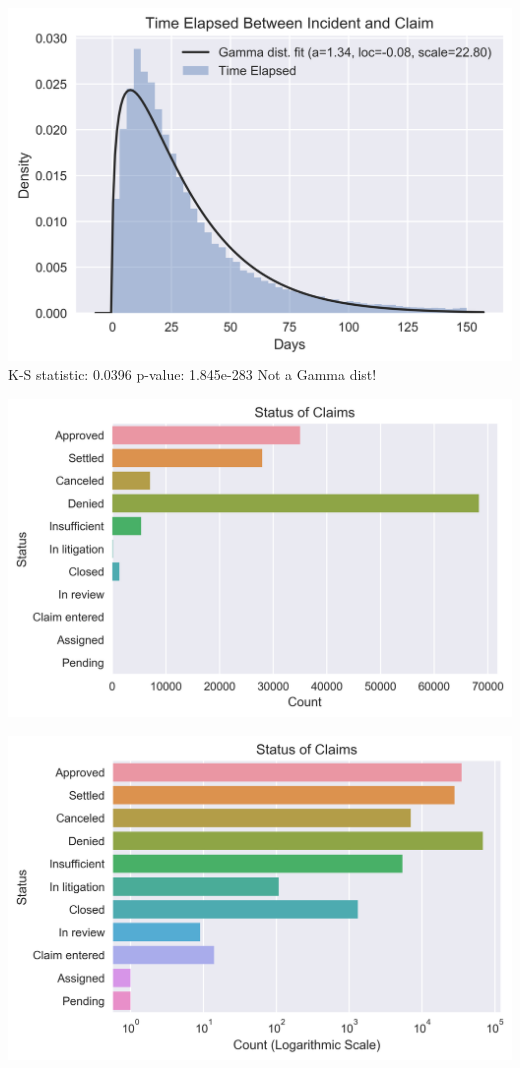 \documentclass{beamer}
\begin{document}
\begin{frame}
	\includegraphics[keepaspectratio, width = \textwidth, height = \textheight]{../plots/wait_time}
	K-S statistic: 0.0396 \qquad p-value: 1.845e-283 \qquad
	Not a Gamma dist!
\end{frame}

\begin{frame}
	\includegraphics[keepaspectratio, width = \textwidth, height = 0.5\textheight]{../plots/status}
	\begin{flushright}
		\includegraphics[keepaspectratio, width = \textwidth, height = 0.5\textheight]{../plots/log_status}
	\end{flushright}
\end{frame}
\end{document}
